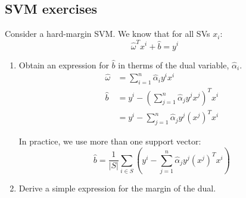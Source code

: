 \subsection{SVM exercises}

\begin{exercise}[breakable]{}{}
	Consider a hard-margin SVM. We know that for all SVs $x_i$:
	\begin{equation}
		\label{eq:svm:margin}
		\widehat\omega^T x^i + \widehat{b} = y^i
	\end{equation}

	\begin{enumerate}
		\item Obtain an expression for $\widehat{b}$ in therms of the
		      dual variable, $\widehat{\alpha}_i$.
		      \begin{align*}
			      \widehat\omega & = \sum_{i=1}^n \widehat\alpha_i y^i x^i                            \\
			      \widehat{b}    & = y^i - \left( \sum_{j=1}^n \widehat\alpha_j y^j x^j \right)^T x^i \\
			                     & = y^i - \sum_{j=1}^n \widehat\alpha_j y^j \left(x^j\right)^T x^i
		      \end{align*}

		      \begin{note}
			      In practice, we use more than one support vector:
			      \begin{equation*}
				      \widehat b = \frac{1}{\left|S\right|} \sum_{i \in S}
				      \left(
				      y^i - \sum_{j=1}^n \widehat\alpha_j y^j \left(x^j\right)^T x^i
				      \right)
			      \end{equation*}
		      \end{note}

		\item Derive a simple expression for the margin of the dual.


\end{enumerate}
\end{exercise}
